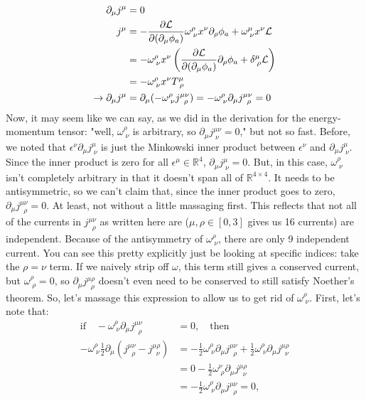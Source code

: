 \begin{align*}
    \partial_\mu j^\mu &= 0\\
    j^\mu &= -\frac{\partial\mathcal{L}}{\partial(\partial_\mu\phi_a)}\omega^\rho_{\;\nu}x^\nu\partial_\rho\phi_a + \omega^\mu_{\;\nu}x^\nu\mathcal{L}\\
    &=-\omega^\rho_{\;\nu}x^\nu\left(\frac{\partial\mathcal{L}}{\partial(\partial_\mu\phi_a)}\partial_\rho\phi_a+\delta^\mu_{\;\rho}\mathcal{L}\right)\\
    &=-\omega^{\rho}_{\;\nu}x^\nu T^\mu_{\;\rho}\\
    \rightarrow \partial_\mu j^\mu &= \partial_\mu(-\omega^{\rho}_{\;\nu} j^{\mu\nu}_{\;\;\rho}) = -\omega^\rho_{\;\nu}\partial_\mu j^{\mu\nu}_{\;\;\rho}= 0
\end{align*}
Now, it may seem like we can say, as we did in the derivation for the energy-momentum tensor: "well, $\omega^\rho_{\;\nu}$ is arbitrary, so $\partial_\mu j^{\mu\nu}_{\;\nu}=0$," but not so fast. Before, we noted that $\epsilon^\nu \partial_{\mu}j^\mu_{\;\nu}$ is just the Minkowski inner product between $\epsilon^\nu$ and $\partial_\mu j^\mu_{\;\nu}$. Since the inner product is zero for all $\epsilon^\mu\in\mathbb{R}^4$, $\partial_\mu j^\mu_{\;\nu}=0$. But, in this case, $\omega^\rho_{\;\nu}$ isn't completely arbitrary in that it doesn't span all of $\mathbb{R}^{4\times 4}$. It needs to be antisymmetric, so we can't claim that, since the inner product goes to zero, $\partial_\mu j^{\mu\nu}_{\;\;\rho}=0$. At least, not without a little massaging first. This reflects that not all of the currents in $j^{\mu\nu}_{\;\;\rho}$ as written here are ($\mu,\rho\in[0,3]$ gives us 16 currents) are independent. Because of the antisymmetry of $\omega^{\rho}_{\;\nu}$, there are only 9 independent current. You can see this pretty explicitly just be looking at specific indices: take the $\rho=\nu$ term. If we naively strip off $\omega$, this term still gives a conserved current, but $\omega^{\rho}_{\;\rho}=0$, so $\partial_\mu j^{\mu\rho}_{\;\;\rho}$ doesn't even need to be conserved to still satisfy Noether's theorem. So, let's massage this expression to allow us to get rid of $\omega^\rho_{\;\nu}$. First, let's note that:
\begin{align*}
    \text{if}\quad -\omega^{\rho}_{\;\nu}\partial_\mu j^{\mu\nu}_{\;\;\rho} &= 0, \quad \text{then}\\
    -\omega^{\rho}_{\;\nu}\frac{1}{2}\partial_\mu\left(j^{\mu\nu}_{\;\;\rho}-j^{\mu\rho}_{\;\;\nu} \right) &= -\frac{1}{2}\omega^{\rho}_{\;\nu}\partial_\mu j^{\mu\nu}_{\;\;\rho}+\frac{1}{2}\omega^\rho_{\;\nu}\partial_\mu j^{\mu\rho}_{\;\;\nu}\\
    &=0 - \frac{1}{2}\omega^{\nu}_{\;\rho}\partial_\mu j^{\mu\rho}_{\;\;\nu}\\
    &=-\frac{1}{2}\omega^{\rho}_{\;\nu}\partial_\mu j^{\mu\nu}_{\;\;\rho} = 0,
\end{align*}
